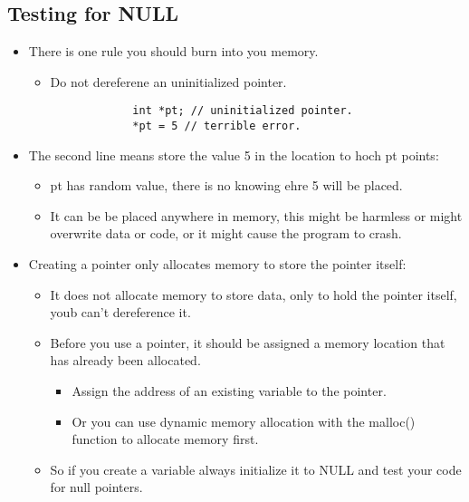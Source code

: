 \subsection{Testing for NULL}
\begin{itemize}
    \item There is one rule you should burn into you memory.
        \begin{itemize}
            \item Do not dereferene an uninitialized pointer. 
        \end{itemize}
            \begin{verbatim}
                int *pt; // uninitialized pointer. 
                *pt = 5 // terrible error. 
            \end{verbatim}
    
    
    \item The second line means store the value 5 in the location to hoch pt points: 
        \begin{itemize}
            \item pt has random value, there is no knowing ehre 5 will be placed. 
            \item It can be be placed anywhere in memory, this might be harmless or might overwrite data or code, or it might cause the program to crash. 
        \end{itemize}
    
    \item Creating a pointer only allocates memory to store the pointer itself:
        \begin{itemize}
            \item It does not allocate memory to store data, only to hold the pointer itself, youb can't dereference it. 
            \item Before you use a pointer, it should be assigned a memory location that has already been allocated.
                \begin{itemize}
                    \item Assign the address of an existing variable to the pointer. 
                    \item Or you can use dynamic memory allocation with the malloc() function to allocate memory first. 
                \end{itemize}
            
            \item So if you create a variable always initialize it to NULL and test your code for null pointers. 
        \end{itemize}
    

\end{itemize}
